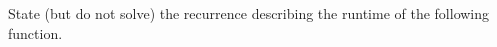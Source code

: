 \begin{prob}
    State (but do not solve) the recurrence describing the runtime of the following function.

    \inputminted{python}{code.py}

\end{prob}
